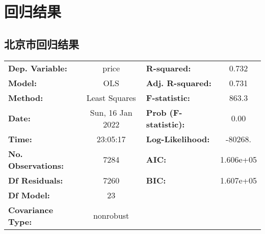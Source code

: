 \section{回归结果} \label{sec:results}
\subsection{北京市回归结果}
\begin{table}[H]
  \centering
  \begin{tabular}{lclc}
    \toprule
    \textbf{Dep. Variable:}    & price            & \textbf{  R-squared:         } & 0.732     \\
    \textbf{Model:}            & OLS              & \textbf{  Adj. R-squared:    } & 0.731     \\
    \textbf{Method:}           & Least Squares    & \textbf{  F-statistic:       } & 863.3     \\
    \textbf{Date:}             & Sun, 16 Jan 2022 & \textbf{  Prob (F-statistic):} & 0.00      \\
    \textbf{Time:}             & 23:05:17         & \textbf{  Log-Likelihood:    } & -80268.   \\
    \textbf{No. Observations:} & 7284             & \textbf{  AIC:               } & 1.606e+05 \\
    \textbf{Df Residuals:}     & 7260             & \textbf{  BIC:               } & 1.607e+05 \\
    \textbf{Df Model:}         & 23               & \textbf{                     } &           \\
    \textbf{Covariance Type:}  & nonrobust        & \textbf{                     } &           \\
    \bottomrule
  \end{tabular}
\end{table}

